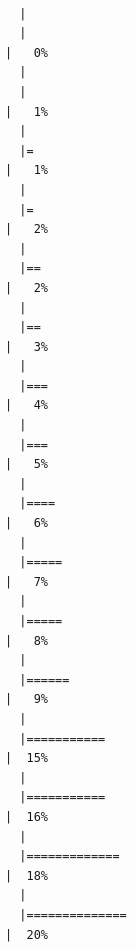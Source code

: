 \documentclass[
  letterpaper,
  DIV=11,
  numbers=noendperiod]{scrreprt}
\begin{document}
\begin{verbatim}

  |                                                                            
  |                                                                      |   0%
  |                                                                            
  |                                                                      |   1%
  |                                                                            
  |=                                                                     |   1%
  |                                                                            
  |=                                                                     |   2%
  |                                                                            
  |==                                                                    |   2%
  |                                                                            
  |==                                                                    |   3%
  |                                                                            
  |===                                                                   |   4%
  |                                                                            
  |===                                                                   |   5%
  |                                                                            
  |====                                                                  |   6%
  |                                                                            
  |=====                                                                 |   7%
  |                                                                            
  |=====                                                                 |   8%
  |                                                                            
  |======                                                                |   9%
  |                                                                            
  |===========                                                           |  15%
  |                                                                            
  |===========                                                           |  16%
  |                                                                            
  |=============                                                         |  18%
  |                                                                            
  |==============                                                        |  20%

\end{verbatim}
\end{document}
